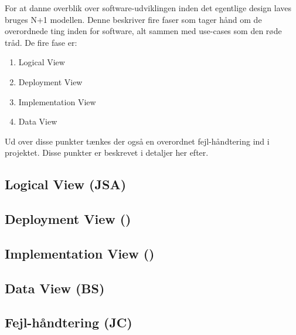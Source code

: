 For at danne overblik over software-udviklingen inden det egentlige design laves bruges N+1 modellen.
Denne beskriver fire faser som tager hånd om de overordnede ting inden for software, alt sammen med use-cases som den røde tråd.
De fire fase er:
\begin{enumerate}
	\item Logical View
	\item Deployment View
	\item Implementation View
	\item Data View
\end{enumerate}

Ud over disse punkter tænkes der også en overordnet fejl-håndtering ind i projektet. Disse punkter er beskrevet i detaljer her efter.

\subsection{Logical View (JSA)}


\subsection{Deployment View ()}


\subsection{Implementation View ()}


\subsection{Data View (BS)}


\subsection{Fejl-håndtering (JC)}

